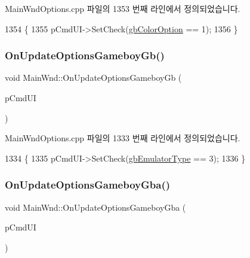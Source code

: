 Main\+Wnd\+Options.\+cpp 파일의 1353 번째 라인에서 정의되었습니다.


\begin{DoxyCode}
1354 \{
1355   pCmdUI->SetCheck(\mbox{\hyperlink{gb_globals_8cpp_abb08650d8f653865820da10dc8e59a8b}{gbColorOption}} == 1);  
1356 \}
\end{DoxyCode}
\mbox{\label{class_main_wnd_a5a439a63c75a38577924c18e6f8b7bf9}} 
\subsubsection{\texorpdfstring{On\+Update\+Options\+Gameboy\+Gb()}{OnUpdateOptionsGameboyGb()}}
{\footnotesize\ttfamily void Main\+Wnd\+::\+On\+Update\+Options\+Gameboy\+Gb (\begin{DoxyParamCaption}\item[{C\+Cmd\+UI $\ast$}]{p\+Cmd\+UI }\end{DoxyParamCaption})\hspace{0.3cm}{\ttfamily [protected]}}



Main\+Wnd\+Options.\+cpp 파일의 1333 번째 라인에서 정의되었습니다.


\begin{DoxyCode}
1334 \{
1335   pCmdUI->SetCheck(\mbox{\hyperlink{gb_globals_8cpp_aab449ed6ecf2bd502928a3d5aa5c54c4}{gbEmulatorType}} == 3);
1336 \}
\end{DoxyCode}
\mbox{\label{class_main_wnd_ac19dc2b23a6bc58bd372598025ebf82b}} 
\subsubsection{\texorpdfstring{On\+Update\+Options\+Gameboy\+Gba()}{OnUpdateOptionsGameboyGba()}}
{\footnotesize\ttfamily void Main\+Wnd\+::\+On\+Update\+Options\+Gameboy\+Gba (\begin{DoxyParamCaption}\item[{C\+Cmd\+UI $\ast$}]{p\+Cmd\+UI }\end{DoxyParamCaption})\hspace{0.3cm}{\ttfamily [protected]}}



